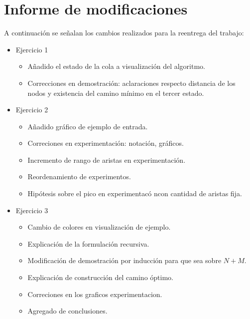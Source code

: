 \section*{Informe de modificaciones}

A continuación se señalan los cambios realizados para la reentrega del trabajo:

\begin{itemize}
	\item{
		Ejercicio 1
		\begin{itemize}
			\item{Añadido el estado de la cola a visualización del algoritmo.}
			\item{Correcciones en demostración: aclaraciones respecto distancia
				de los nodos y existencia del camino mínimo en el tercer estado.}
		\end{itemize}
	}
	\item{
		Ejercicio 2
		\begin{itemize}
			\item{Añadido gráfico de ejemplo de entrada.}
			\item{Correciones en experimentación: notación, gráficos.}
			\item{Incremento de rango de aristas en experimentación.}
			\item{Reordenamiento de experimentos.}
			\item{Hipótesis sobre el pico en experimentacó ncon cantidad de aristas fija.}
		\end{itemize}
	}
	\item{
		Ejercicio 3
		\begin{itemize}
			\item{Cambio de colores en visualización de ejemplo.}
			\item{Explicación de la formulación recursiva.}
			\item{Modificación de demostración por inducción para que sea sobre
				$N + M$.}
			\item{Explicación de construcción del camino óptimo.}
			\item{Correciones en los graficos experimentacion.}
			\item{Agregado de conclusiones.}
		\end{itemize}
	}
\end{itemize}
